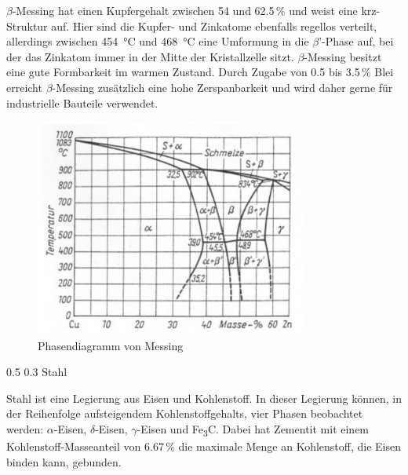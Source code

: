 \documentclass[german, %
parskip=full, %
bibliography=totoc, %
]{scrartcl}
\makeatletter
\renewcommand\subsection{\@startsection 
   {subsection}{2}{0mm}%
   {0.5\baselineskip}%
   {0.3\baselineskip}%
   {\bfseries\sffamily\large}%
   }
\makeatother
\begin{document}
$\beta$-Messing hat einen Kupfergehalt zwischen 54 und 62.5\,\% und weist eine krz-Struktur auf. Hier sind die Kupfer- und Zinkatome ebenfalls regellos verteilt, allerdings zwischen \SI{454}{\degree}C und \SI{468}{\degree}C eine Umformung in die $\beta$'-Phase auf, bei der das Zinkatom immer in der Mitte der Kristallzelle sitzt. $\beta$-Messing besitzt eine gute Formbarkeit im warmen Zustand. Durch Zugabe von 0.5 bis 3.5\,\% Blei erreicht $\beta$-Messing zusätzlich eine hohe Zerspanbarkeit und wird daher gerne für industrielle Bauteile verwendet.

\begin{figure}[hb] 
  \centering
     \includegraphics[width=0.8\textwidth]{Messing_Phase}
  \caption{Phasendiagramm von Messing}
  \label{fig:phasemessing}
\end{figure}

\subsection{Stahl}

Stahl ist eine Legierung aus Eisen und Kohlenstoff. In dieser Legierung können, in der Reihenfolge aufsteigendem Kohlenstoffgehalts, vier Phasen beobachtet werden: $\alpha$-Eisen, $\delta$-Eisen, $\gamma$-Eisen und Fe\textsubscript{3}C. Dabei hat Zementit mit einem Kohlenstoff-Masseanteil von 6.67\,\% die maximale Menge an Kohlenstoff, die Eisen binden kann, gebunden. 
\end{document}

